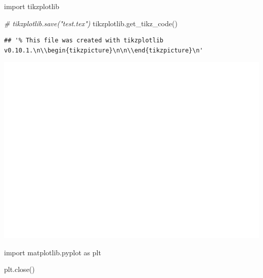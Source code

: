 \documentclass[
]{book}
\newenvironment{Shaded}{\begin{snugshade}}{\end{snugshade}}
\newcommand{\CommentTok}[1]{\textcolor[rgb]{0.56,0.35,0.01}{\textit{#1}}}
\newcommand{\ImportTok}[1]{#1}
\newcommand{\NormalTok}[1]{#1}
\theoremstyle{definition}
\theoremstyle{definition}
\theoremstyle{definition}
\theoremstyle{definition}
\theoremstyle{remark}
\begin{document}
\begin{Shaded}
\begin{Highlighting}[]
\ImportTok{import}\NormalTok{ tikzplotlib}

\CommentTok{\# tikzplotlib.save("test.tex")}
\NormalTok{tikzplotlib.get\_tikz\_code()}
\end{Highlighting}
\end{Shaded}

\begin{verbatim}
## '% This file was created with tikzplotlib v0.10.1.\n\\begin{tikzpicture}\n\n\\end{tikzpicture}\n'
\end{verbatim}

\includegraphics{202401311000-TikZ_files/figure-latex/unnamed-chunk-168-2}

\begin{Shaded}
\begin{Highlighting}[]
\ImportTok{import}\NormalTok{ matplotlib.pyplot }\ImportTok{as}\NormalTok{ plt}

\NormalTok{plt.close()}
\end{Highlighting}
\end{Shaded}
\end{document}

